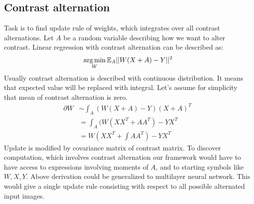 \subsection{Contrast alternation}
Task is to find update rule of weights, which integrates over all contrast alternations.
Let $A$ be a random variable describing how we want to alter contrast. Linear regression
with contrast alternation can be described as: 
\begin{align*}
& \operatorname*{arg\,min}_{W} \mathbb{E}_A ||W(X + A) - Y||^2\\
\end{align*}
Usually contrast alternation is described with continuous distribution. It means that
expected value will be replaced with integral. Let's assume for simplicity that mean 
of contrast alternation is zero.
\begin{align*}
\partial W & \sim \int_A (W(X + A) - Y)(X + A)^T \\
   & = \int_A (W(XX^T + AA^T) - YX^T \\
   & = W(XX^T + \int AA^T) - YX^T 
\end{align*}
Update is modified by covariance matrix of contrast matrix. To discover computation,
which involves contrast alternation our framework would have to have access to 
expressions involving moments of $A$, and to starting symbols like $W, X, Y$.
Above derivation could be generalized to multilayer neural network. This would
give a single update rule consisting with respect to all possible alternated
input images.

